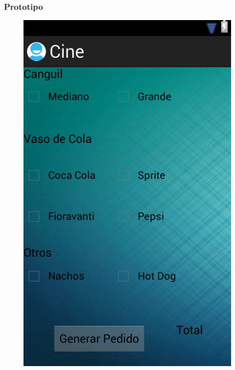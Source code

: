 \documentclass{beamer}
\begin{document}
\begin{frame}[allowframbreaks]
\frametitle{Prototipo}
\begin{figure}[h]
\centering
\includegraphics[height=1.0\textheight]{orden_compra.png}
\end{figure}
\end{frame}
\end{document}
